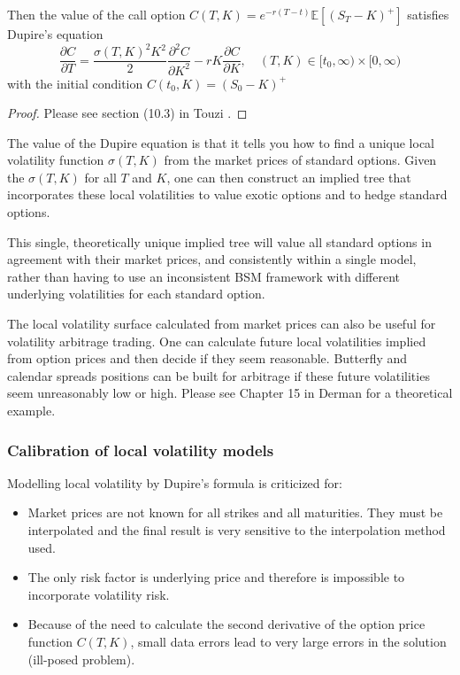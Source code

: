 \documentclass[10pt]{article}
\theoremstyle{plain}
\numberwithin{equation}{section}
\numberwithin{table}{section}
\newcommand{\s}{\sigma}
\newcommand{\pa}{\partial}
\newcommand{\E}{\mathbb{E}}
\begin{document}
Then the value of the call option $C(T, K)=e^{-r(T-t)}\E [(S_T - K)^{+}]$ satisfies Dupire's equation
\[
    \frac{\pa C}{\pa T} = \frac{\s(T,K)^2 K^2}{2} \frac{\pa^2 C}{\pa K^2} - rK\frac{\pa C}{\pa K} ,  \quad (T,K) \in [t_0, \infty) \times [0, \infty) 
\] 
with the initial condition $C(t_0, K) = (S_0 - K)^+$

\begin{proof}
 Please see section (10.3) in Touzi \cite{Touzi}. 
\end{proof}

The value of the Dupire equation is that it tells you how to find a unique
local volatility function $\s(T, K)$ from the market prices of standard options.
Given the $\s(T, K)$ for all $T$ and $K$, one can then construct an implied tree
that incorporates these local volatilities to value exotic options and to hedge
standard options. 

This single, theoretically unique implied tree will value
all standard options in agreement with their market prices, and consistently
within a single model, rather than having to use an inconsistent BSM framework
with different underlying volatilities for each standard option.

The local volatility surface calculated from market prices can also be
useful for volatility arbitrage trading. One can calculate future local volatilities
implied from option prices and then decide if they seem reasonable. Butterfly and calendar spreads 
positions can be built for arbitrage if these future volatilities seem unreasonably low or high.
Please see Chapter 15 in Derman\cite{Derman} for a theoretical example.


\subsubsection{Calibration of local volatility models}
Modelling local volatility by Dupire's formula is criticized for: 
\begin{itemize}
    \item Market prices are not known for all strikes and all maturities. They must
    be interpolated and the final result is very sensitive to the interpolation
    method used.
    \item The only risk factor is underlying price and therefore is impossible to incorporate 
    volatility risk.
    \item Because of the need to calculate the second derivative of the option price
    function $C(T, K)$, small data errors lead to very large errors in the solution
    (ill-posed problem).
\end{itemize}
\end{document}
